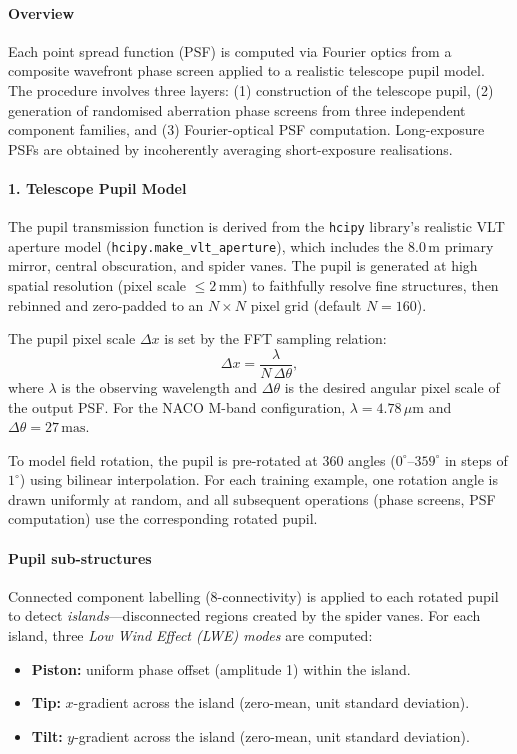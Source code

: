 \documentclass{aa}
\begin{document}
\paragraph{Overview}

Each point spread function (PSF) is computed via Fourier optics from a composite wavefront phase screen applied to a realistic telescope pupil model. The procedure involves three layers: (1) construction of the telescope pupil, (2) generation of randomised aberration phase screens from three independent component families, and (3) Fourier-optical PSF computation. Long-exposure PSFs are obtained by incoherently averaging short-exposure realisations.

\paragraph{1. Telescope Pupil Model}

The pupil transmission function is derived from the \texttt{hcipy} library's realistic VLT aperture model (\texttt{hcipy.make\_vlt\_aperture}), which includes the 8.0\,m primary mirror, central obscuration, and spider vanes. The pupil is generated at high spatial resolution (pixel scale $\leq 2\,\mathrm{mm}$) to faithfully resolve fine structures, then rebinned and zero-padded to an $N \times N$ pixel grid (default $N = 160$).

The pupil pixel scale $\Delta x$ is set by the FFT sampling relation:
\begin{equation}
\Delta x = \frac{\lambda}{N \,\Delta\theta},
\end{equation}
where $\lambda$ is the observing wavelength and $\Delta\theta$ is the desired angular pixel scale of the output PSF. For the NACO M-band configuration, $\lambda = 4.78\,\mu\mathrm{m}$ and $\Delta\theta = 27\,\mathrm{mas}$.

To model field rotation, the pupil is pre-rotated at 360 angles ($0^\circ$--$359^\circ$ in steps of $1^\circ$) using bilinear interpolation. For each training example, one rotation angle is drawn uniformly at random, and all subsequent operations (phase screens, PSF computation) use the corresponding rotated pupil.

\paragraph{Pupil sub-structures}

Connected component labelling (8-connectivity) is applied to each rotated pupil to detect \emph{islands}---disconnected regions created by the spider vanes. For each island, three \emph{Low Wind Effect (LWE) modes} are computed:
\begin{itemize}
    \item \textbf{Piston:} uniform phase offset (amplitude 1) within the island.
    \item \textbf{Tip:} $x$-gradient across the island (zero-mean, unit standard deviation).
    \item \textbf{Tilt:} $y$-gradient across the island (zero-mean, unit standard deviation).
\end{itemize}
\end{document}
